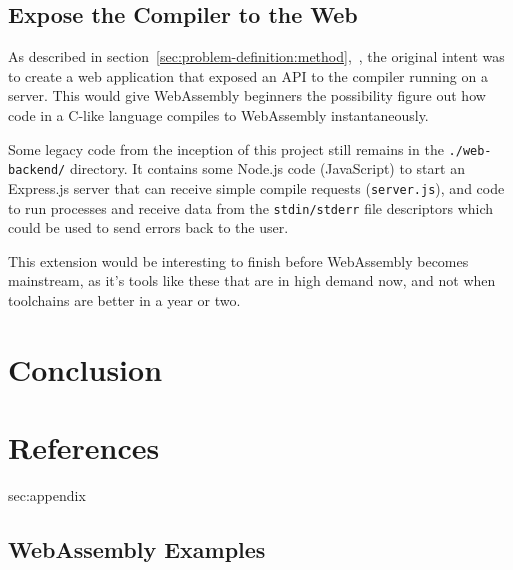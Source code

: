 \documentclass[a4paper]{article}
\begin{document}
\subsection{Expose the Compiler to the Web}
As described in section~\ref{sec:problem-definition:method},~, the original intent was to create a web application that exposed an API to the compiler running on a server. This would give WebAssembly beginners the possibility figure out how code in a C-like language compiles to WebAssembly instantaneously.

Some legacy code from the inception of this project still remains in the \texttt{./web-backend/} directory. It contains some Node.js code (JavaScript) to start an Express.js server that can receive simple compile requests (\texttt{server.js}), and code to run processes and receive data from the \texttt{stdin/stderr} file descriptors which could be used to send errors back to the user.

This extension would be interesting to finish before WebAssembly becomes mainstream, as it's tools like these that are in high demand now, and not when toolchains are better in a year or two.

\newpage
\section{Conclusion}
\label{sec:conclusion}

\newpage
\section{References}
\label{sec:references}
\begingroup
\renewcommand{\section}[2]{}%

{}
\endgroup

\newpage
\section{Appendix}
\label{sec:appendix}

\subsection{WebAssembly Examples}
\label{sec:appendix:wasm-examples}
\end{document}
